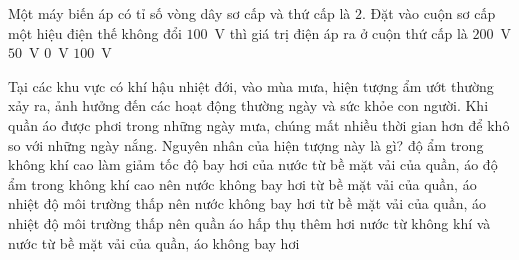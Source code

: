 	\begin{ex}%
		Một máy biến áp có tỉ số vòng dây sơ cấp và thứ cấp là $2$. Đặt vào cuộn sơ cấp một hiệu điện thế không đổi $100$~V thì giá trị điện áp ra ở cuộn thứ cấp là
		\choice
		{$200$~V}
		{$50$~V}
		{\True $0$~V}
		{$100$~V}
	\end{ex}

	\begin{ex}%
		Tại các khu vực có khí hậu nhiệt đới, vào mùa mưa, hiện tượng ẩm ướt thường xảy ra, ảnh hưởng đến các hoạt động thường ngày và sức khỏe con người. Khi quần áo được phơi trong những ngày mưa, chúng mất nhiều thời gian hơn để khô so với những ngày nắng. Nguyên nhân của hiện tượng này là gì?
		\choice
		{\True độ ẩm trong không khí cao làm giảm tốc độ bay hơi của nước từ bề mặt vải của quần, áo}
		{độ ẩm trong không khí cao nên nước không bay hơi từ bề mặt vải của quần, áo}
		{nhiệt độ môi trường thấp nên nước không bay hơi từ bề mặt vải của quần, áo}
		{nhiệt độ môi trường thấp nên quần áo hấp thụ thêm hơi nước từ không khí và nước từ bề mặt vải của quần, áo không bay hơi}
	\end{ex}

